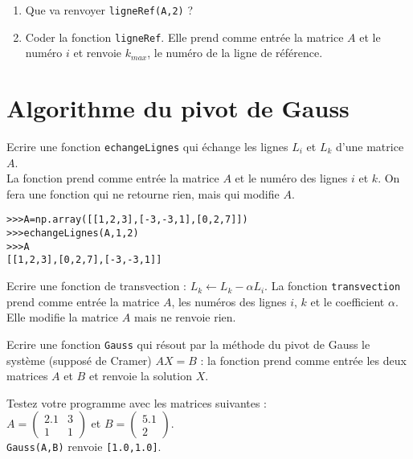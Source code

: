 \begin{exercice}
\begin{enumerate}
\item Que va renvoyer \verb?ligneRef(A,2)? ?
\item Coder la fonction \verb?ligneRef?. Elle prend comme entrée la matrice $A$ et le numéro $i$ et renvoie $k_{max}$, le numéro de la ligne de référence.
\end{enumerate}
\end{exercice}


\section{Algorithme du pivot de Gauss}

\begin{exercice}
Ecrire une fonction \verb?echangeLignes? qui \' echange les lignes $L_i$ et $L_k$ d'une matrice $A$.\\
La fonction prend comme entr\' ee la matrice $A$ et le num\' ero des lignes $i$ et $k$. On fera une fonction qui ne retourne rien, mais qui modifie $A$.
\begin{verbatim}
>>>A=np.array([[1,2,3],[-3,-3,1],[0,2,7]])
>>>echangeLignes(A,1,2)
>>>A
[[1,2,3],[0,2,7],[-3,-3,1]]
\end{verbatim}
\end{exercice}


\begin{exercice}
Ecrire une fonction de transvection : $L_k \leftarrow L_k-\alpha L_i$. La fonction \verb?transvection? prend comme entr\' ee la matrice $A$, les num\' eros des lignes $i$, $k$ et le coefficient $\alpha$. Elle modifie la matrice $A$ mais ne renvoie rien.
\end{exercice}


\begin{exercice}
Ecrire une fonction \verb?Gauss? qui r\' esout par la m\' ethode du pivot de Gauss le syst\` eme (suppos\' e de Cramer) $AX=B$ : la fonction prend comme entr\' ee les deux matrices $A$ et $B$ et renvoie la solution $X$.
\end{exercice}


\begin{exercice}
Testez votre programme avec les matrices suivantes :\\
$A=\begin{pmatrix}
2.1&3\\1&1
\end{pmatrix}$ et $B=\begin{pmatrix}
5.1\\2
\end{pmatrix}$.\\
\verb?Gauss(A,B)? renvoie \verb?[1.0,1.0]?.
\end{exercice}




